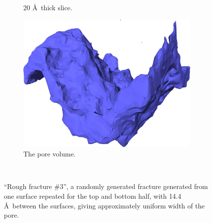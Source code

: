 \begin{figure}[!p]
{\begin{subfigure}[t]{\myfigwidth}
            \caption{20 \AA\ thick slice.}%
        \end{subfigure}%
        \hspace{\myhfillwidth}%
        \begin{subfigure}[t]{\myfigwidth}%
            \centering%
            \includegraphics[width=\textwidth]{images/systems/trimmed-rough_fracture04_11}%
            \caption{The pore volume.}%
        \end{subfigure}%
    }%
    \vspace{10pt}\\%
    \caption{%
        ``Rough fracture \#3'', a randomly generated fracture generated from one surface repeated for the top and bottom half, with 14.4 \AA\ between the surfaces, giving approximately uniform width of the pore.%
        \label{fig:renderings_rough_fracture04_same_distance}%
    }%
\end{figure}%



